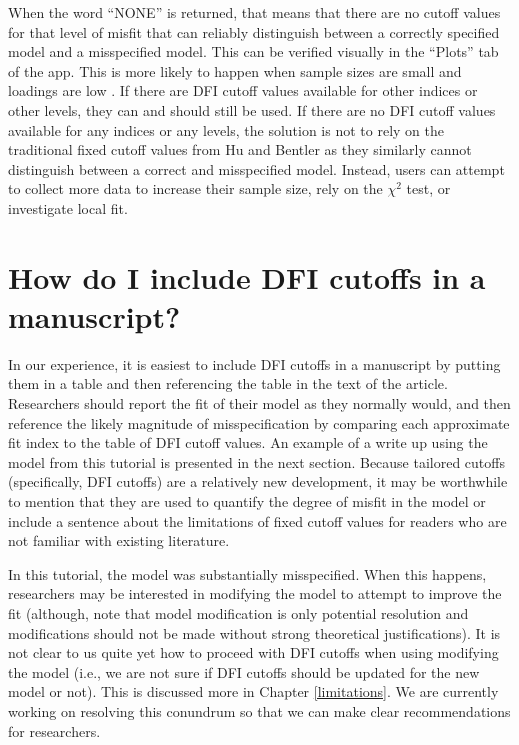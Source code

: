 \documentclass[
]{book}
\begin{document}
When the word ``NONE'' is returned, that means that there are no cutoff values for that level of misfit that can reliably distinguish between a correctly specified model and a misspecified model. This can be verified visually in the ``Plots'' tab of the app. This is more likely to happen when sample sizes are small and loadings are low \citep{hancock_reliability_2011, heene_masking_2011, mcneish_thorny_2018}. If there are DFI cutoff values available for other indices or other levels, they can and should still be used. If there are no DFI cutoff values available for any indices or any levels, the solution is not to rely on the traditional fixed cutoff values from Hu and Bentler as they similarly cannot distinguish between a correct and misspecified model. Instead, users can attempt to collect more data to increase their sample size, rely on the \({\chi}^2\) test, or investigate local fit.

\hypertarget{manuscript}{%
\chapter{How do I include DFI cutoffs in a manuscript?}\label{manuscript}}

In our experience, it is easiest to include DFI cutoffs in a manuscript by putting them in a table and then referencing the table in the text of the article. Researchers should report the fit of their model as they normally would, and then reference the likely magnitude of misspecification by comparing each approximate fit index to the table of DFI cutoff values. An example of a write up using the model from this tutorial is presented in the next section. Because tailored cutoffs (specifically, DFI cutoffs) are a relatively new development, it may be worthwhile to mention that they are used to quantify the degree of misfit in the model or include a sentence about the limitations of fixed cutoff values for readers who are not familiar with existing literature.

In this tutorial, the model was substantially misspecified. When this happens, researchers may be interested in modifying the model to attempt to improve the fit (although, note that model modification is only potential resolution and modifications should not be made without strong theoretical justifications). It is not clear to us quite yet how to proceed with DFI cutoffs when using modifying the model (i.e., we are not sure if DFI cutoffs should be updated for the new model or not). This is discussed more in Chapter \ref{limitations}. We are currently working on resolving this conundrum so that we can make clear recommendations for researchers.
\end{document}

